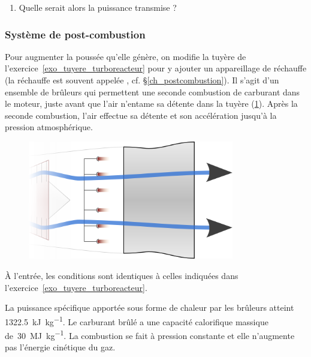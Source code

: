 	\begin{enumerate}
		\item Quelle serait alors la puissance transmise ?
	\end{enumerate}


\subsubsection{Système de post-combustion}
\label{exo_postcombustion}

	Pour augmenter la poussée qu’elle génère, on modifie la tuyère de l’exercice~\ref{exo_tuyere_turboreacteur} pour y ajouter un appareillage de réchauffe (la réchauffe est souvent appelée , cf. \S\ref{ch_postcombustion}). Il s’agit d’un ensemble de brûleurs qui permettent une seconde combustion de carburant dans le moteur, juste avant que l’air n’entame sa détente dans la tuyère (\cref{fig_afterburner}). Après la seconde combustion, l’air effectue sa détente et son accélération jusqu’à la pression atmosphérique.

	\begin{figure}
		\begin{center}
			\includegraphics[width=9cm, max width=0.8\columnwidth]{images/postcombustion.png}
		\end{center}
		\label{fig_afterburner}
	\end{figure}

	À l’entrée, les conditions sont identiques à celles indiquées dans l’exercice~\ref{exo_tuyere_turboreacteur}.
	
	La puissance spécifique apportée sous forme de chaleur par les brûleurs atteint \SI{1322,5}{\kilo\joule\per\kilogram}. Le carburant brûlé a une capacité calorifique massique de~\SI{30}{\mega\joule\per\kilogram}. La combustion se fait à pression constante et elle n’augmente pas l’énergie cinétique du gaz.
	
